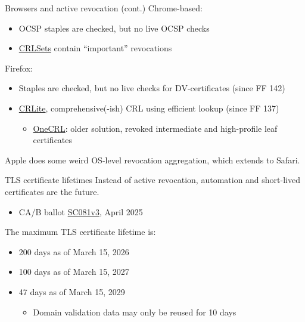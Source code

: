 \begin{frame}{Browsers and active revocation (cont.)}
  Chrome-based:
  \begin{itemize}[<+(1)->]
    \item OCSP staples are checked, but no live OCSP checks
    \item \href{https://www.chromium.org/Home/chromium-security/crlsets/}{CRLSets} contain \enquote{important} revocations
  \end{itemize}

  \vspace*{1em}

  \pause
  Firefox:
  \begin{itemize}[<+(1)->]
    \item Staples are checked, but no live checks for DV-certificates (since FF 142)
    \item \href{https://hacks.mozilla.org/2025/08/crlite-fast-private-and-comprehensive-certificate-revocation-checking-in-firefox/}{CRLite}, comprehensive(-ish) CRL using efficient lookup (since FF 137)
    \par
    \begin{itemize}
      \item \href{https://wiki.mozilla.org/CA/Revocation_Checking_in_Firefox\#OneCRL}{OneCRL}: older solution, revoked intermediate and high-profile leaf certificates
    \end{itemize}
  \end{itemize}

  \vspace*{1em}

  \pause
  Apple does some weird OS-level revocation aggregation, which extends to Safari.
\end{frame}

\begin{frame}{TLS certificate lifetimes}
  Instead of active revocation, automation and short-lived certificates are the future.
  \begin{itemize}
    \item CA/B ballot \href{https://cabforum.org/2025/04/11/ballot-sc081v3-introduce-schedule-of-reducing-validity-and-data-reuse-periods/}{SC081v3}, April 2025
  \end{itemize}

  \vspace*{1em}

  \pause
  The maximum TLS certificate lifetime is:
  \begin{itemize}
    \item 200 days as of March 15, 2026
    \item 100 days as of March 15, 2027
    \item 47 days as of March 15, 2029
    \par
    \begin{itemize}[<+(1)->]
      \item Domain validation data may only be reused for 10 days
    \end{itemize}
  \end{itemize}
\end{frame}

